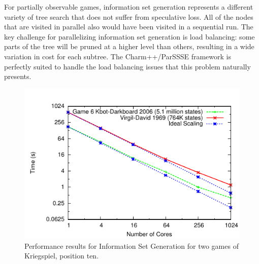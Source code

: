 \documentclass[10pt, conference, compsocconf]{IEEEtran}
\begin{document}
For partially observable games, information set generation represents a
different variety of tree search that does not suffer from speculative loss.
All of the nodes that are visited in parallel also would have been visited in a
sequential run.  The key challenge for parallelizing information set generation
is load balancing: some parts of the tree will be pruned at a higher level than
others, resulting in a wide variation in cost for each subtree.  The {\sc
Charm++/ParSSSE} framework is perfectly suited to handle the load balancing
issues that this problem naturally presents.

\begin{figure}[t]
 \centering \includegraphics[scale=1]{plots/new.pdf} %
\caption{Performance results for Information Set Generation for two games of Kriegspiel, position ten.}
\label{prob4}
\vspace{-0.2in} 
\end{figure}
\end{document}

